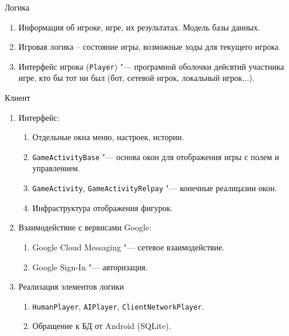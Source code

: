 \documentclass{beamer}
\def\t{\texttt}
\begin{document}
\begin{frame}[t]{Логика}
	\begin{enumerate}
		\item Информация об игроке, игре, их результатах. Модель базы данных.
		\item Игровая логика -- состояние игры, возможные ходы для текущего игрока.
		\item Интерфейс игрока (\t{Player}) "--- програмной оболочки дейсвтий участника игре, кто бы тот ни был (бот, сетевой игрок, локальный игрок...).
	\end{enumerate}
\end{frame}

\begin{frame}[t]{Клиент}
	\begin{enumerate}
	\item
		Интерфейс:
		\begin{enumerate}
			\item Отдельные окна меню, настроек, истории.
			\item \t{GameActivityBase} "--- основа окон для отображения игры с полем и управлением.
			\item \t{GameActivity}, \t{GameActivityRelpay} "--- конечные реалицазии окон.
			\item Инфраструктура отображения фигурок.
		\end{enumerate}

	\item
		Взаимодействие с вервисами Google:
		\begin{enumerate}
			\item Google Cloud Messaging "--- сетевое взаимодействие.
			\item Google Sign-In "--- авторизация.
		\end{enumerate}

	\item
		Реализация элементов логики
		\begin{enumerate}
			\item \t{HumanPlayer}, \t{AIPlayer}, \t{ClientNetworkPlayer}.
			\item Обращение к БД от Android (SQLite).
		\end{enumerate}
	\end{enumerate}
\end{frame}
\end{document}
